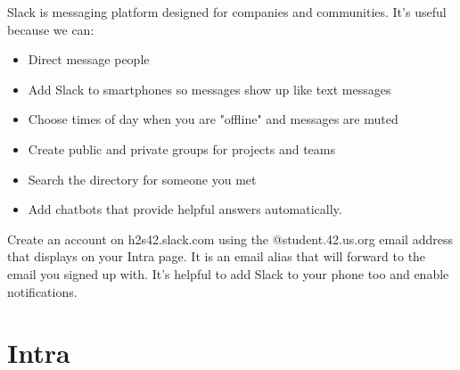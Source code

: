 \documentclass{42-en}
\begin{document}
Slack is messaging platform designed for companies and communities. It's useful because we can:
\begin{itemize}

	\item Direct message people
	\item Add Slack to smartphones so messages show up like text messages
	\item Choose times of day when you are "offline" and messages are muted
	\item Create public and private groups for projects and teams
	\item Search the directory for someone you met
	\item Add chatbots that provide helpful answers automatically.

\end{itemize}

Create an account on h2s42.slack.com using the @student.42.us.org email address that displays on your Intra page. It is an email alias that will forward to the email you signed up with. It's helpful to add Slack to your phone too and enable notifications.




\chapter{Intra}
\end{document}
